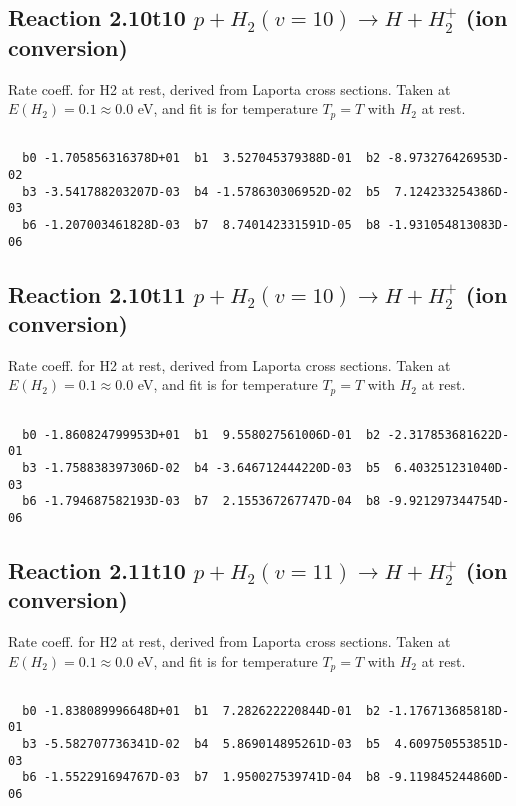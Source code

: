 \documentclass[12pt,dvipdfmx]{article}
\begin{document}
\newpage
\subsection{
Reaction 2.10t10
$ p + H_2(v=10) \rightarrow H + H_2^+$ (ion conversion)
}
Rate coeff. for H2 at rest, derived from Laporta cross sections.
Taken at $E(H_2) = 0.1 \approx 0.0$ eV,  and fit is for temperature $T_p=T$ with $H_2$ at rest.

\begin{small}\begin{verbatim}

  b0 -1.705856316378D+01  b1  3.527045379388D-01  b2 -8.973276426953D-02
  b3 -3.541788203207D-03  b4 -1.578630306952D-02  b5  7.124233254386D-03
  b6 -1.207003461828D-03  b7  8.740142331591D-05  b8 -1.931054813083D-06

\end{verbatim}\end{small}

\newpage
\subsection{
Reaction 2.10t11
$ p + H_2(v=10) \rightarrow H + H_2^+$ (ion conversion)
}
Rate coeff. for H2 at rest, derived from Laporta cross sections.
Taken at $E(H_2) = 0.1 \approx 0.0$ eV,  and fit is for temperature $T_p=T$ with $H_2$ at rest.

\begin{small}\begin{verbatim}

  b0 -1.860824799953D+01  b1  9.558027561006D-01  b2 -2.317853681622D-01
  b3 -1.758838397306D-02  b4 -3.646712444220D-03  b5  6.403251231040D-03
  b6 -1.794687582193D-03  b7  2.155367267747D-04  b8 -9.921297344754D-06

\end{verbatim}\end{small}

\newpage
\subsection{
Reaction 2.11t10
$ p + H_2(v=11) \rightarrow H + H_2^+$ (ion conversion)
}
Rate coeff. for H2 at rest, derived from Laporta cross sections.
Taken at $E(H_2) = 0.1 \approx 0.0$ eV,  and fit is for temperature $T_p=T$ with $H_2$ at rest.

\begin{small}\begin{verbatim}

  b0 -1.838089996648D+01  b1  7.282622220844D-01  b2 -1.176713685818D-01
  b3 -5.582707736341D-02  b4  5.869014895261D-03  b5  4.609750553851D-03
  b6 -1.552291694767D-03  b7  1.950027539741D-04  b8 -9.119845244860D-06

\end{verbatim}\end{small}
\end{document}
